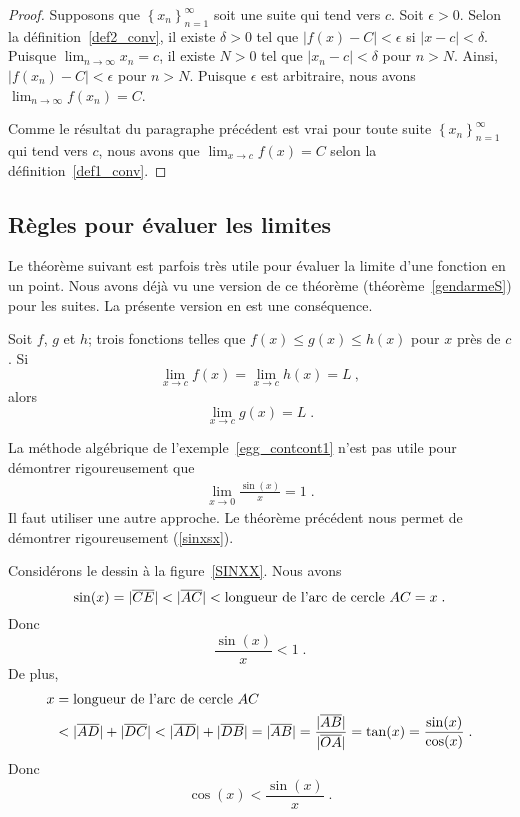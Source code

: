 {\begin{proof}
Supposons que $\displaystyle \left\{ x_n \right\}_{n=1}^\infty$ soit
une suite qui tend vers $c$.  Soit $\epsilon >0$.  Selon la
définition~\ref{def2_conv}, il existe $\delta >0$ tel que
$\displaystyle \left|f(x) -C\right| < \epsilon$ si
$\displaystyle \left|x -c\right| < \delta$.  Puisque
$\displaystyle \lim_{n\rightarrow \infty} x_n = c$, il existe $N>0$
tel que $\displaystyle \left|x_n - c \right| < \delta$ pour $n>N$.
Ainsi,
$\displaystyle \left|f(x_n) -C\right| < \epsilon$ pour $n>N$.  Puisque
$\epsilon$ est arbitraire, nous avons
$\displaystyle \lim_{n\rightarrow \infty} f(x_n) = C$.

Comme le résultat du paragraphe précédent est vrai pour toute suite
$\displaystyle \left\{ x_n \right\}_{n=1}^\infty$ qui tend vers $c$,
nous avons que $\displaystyle \lim_{x\rightarrow c} f(x) = C$ selon la
définition~\ref{def1_conv}.
\end{proof}

\subsection{Règles pour évaluer les limites}

Le théorème suivant est parfois très utile pour évaluer la limite
d'une fonction en un point.  Nous avons déjà vu une version de ce théorème
(théorème~\ref{gendarmeS}) pour les suites.  La présente version
en est une conséquence.

\begin{theorem}
Soit $f$, $g$ et $h$; trois fonctions telles que
$f(x) \leq g(x) \leq h(x)$ pour $x$ près de $c$.  Si
\[
\lim_{x\rightarrow c} f(x) = \lim_{x\rightarrow c} h(x) = L \ ,
\]
alors
\[
\lim_{x\rightarrow c} g(x) = L \; .
\]
\label{gendarmeF}
\end{theorem}

\begin{egg}[\theory]
La méthode algébrique de l'exemple~\ref{egg_contcont1} n'est pas utile
pour démontrer rigoureusement que
\begin{align} \label{sinxsx}
\lim_{x\rightarrow 0} \frac{\sin(x)}{x} = 1 \; .
\end{align}
Il faut utiliser une autre approche.  Le théorème précédent nous
permet de démontrer rigoureusement (\ref{sinxsx}).

Considérons le dessin à la figure~\ref{SINXX}.  Nous avons
\[
\sin(x) = |\overline{CE}| < |\overline{AC}|
< \text{longueur de l'arc de cercle}\ AC = x \; .
\]
Donc
\begin{equation}\label{inequ1}
\frac{\sin(x)}{x} < 1 \; .
\end{equation}
De plus,
\begin{align*}
x &= \text{longueur de l'arc de cercle}\ AC \\
&< |\overline{AD}| + |\overline{DC}| < |\overline{AD}| + |\overline{DB}|
= |\overline{AB}| = \frac{|\overline{AB}|}{|\overline{OA}|}
= \tan(x) = \frac{\sin(x)}{\cos(x)} \; .
\end{align*}
Donc
\begin{equation}\label{inequ2}
\cos(x) < \frac{\sin(x)}{x} \; .
\end{equation}


\end{egg}}
